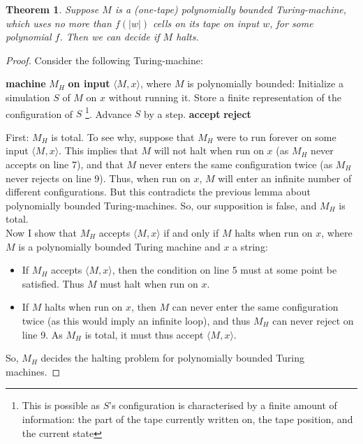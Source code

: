 \documentclass[a4paper,12pt]{scrartcl}
\newcommand{\Machine}[2]{\State \textbf{machine} #1 \textbf{on input} #2:}
\newcommand{\Reject}{\State \textbf{reject}}
\newcommand{\Accept}{\State \textbf{accept}}
\newcommand{\encode}[1]{\langle #1 \rangle}
\newtheorem{theorem}{Theorem}
\begin{document}
\begin{theorem}
    Suppose $M$ is a (one-tape) polynomially bounded Turing-machine, which uses no more than $f(|w|)$ cells on its tape on input $w$, for some polynomial $f$. Then we can decide if $M$ halts.
\end{theorem}
\begin{proof}
    Consider the following Turing-machine:
\begin{algorithmic}[1]
    \Machine{$M_H$}{$\langle M, x \rangle$, where $M$ is polynomially bounded}
    \State Initialize a simulation $S$ of $M$ on $x$ without running it.
    \Repeat
        \State Store a finite representation of the configuration of $S$ \footnote{This is possible as $S$'s configuration is characterised by a finite amount of information: the part of the tape currently written on, the tape position, and the current state}.
        \State Advance $S$ by a step.
            \Accept
            \Reject
        \EndIf
\end{algorithmic}
    First: $M_H$ is total. To see why, suppose that $M_H$ were to run forever on some input $\encode{M, x}$. This implies that $M$ will not halt when run on $x$ (as $M_H$ never accepts on line 7), and that $M$ never enters the same configuration twice (as $M_H$ never rejects on line 9). Thus, when run on $x$, $M$ will enter an infinite number of different configurations. But this contradicts the previous lemma about polynomially bounded Turing-machines. So, our supposition is false, and $M_H$ is total. \\

    Now I show that $M_H$ accepts $\encode{M, x}$ if and only if $M$ halts when run on $x$, where $M$ is a polynomially bounded Turing machine and $x$ a string:
    \begin{itemize}
        \item If $M_H$ accepts $\langle M, x \rangle$, then the condition on line 5 must at some point be satisfied. Thus $M$ must halt when run on $x$.
        \item If $M$ halts when run on $x$, then $M$ can never enter the same configuration twice (as this would imply an infinite loop), and thus $M_H$ can never reject on line 9. As $M_H$ is total, it must thus accept $\encode{M, x}$.
    \end{itemize}
    So, $M_H$ decides the halting problem for polynomially bounded Turing machines.
\end{proof}
\end{document}
